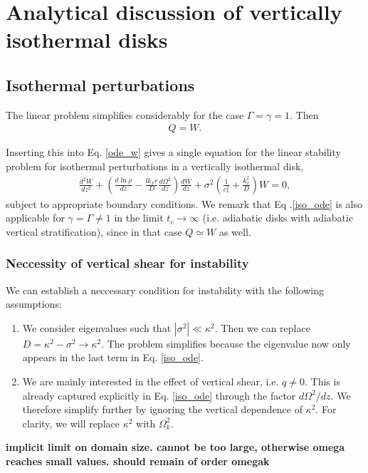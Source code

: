 \section{Analytical discussion of vertically isothermal disks}
\subsection{Isothermal perturbations}
The linear problem simplifies considerably for the case
$\Gamma=\gamma=1$. Then 
\begin{align}
  Q=W. 
\end{align}

Inserting this into Eq. \ref{ode_w} gives a single equation for the linear stability
problem for isothermal perturbations in a vertically isothermal disk, 
\begin{align}\label{iso_ode}
  \frac{d^2W}{dz^2} + \left(\frac{d\ln{\rho}}{dz} - \frac{\ii k_x
      r}{D}\frac{d\Omega^2}{dz}\right) \frac{dW}{dz} +
  \sigma^2\left(\frac{1}{c_s^2} + \frac{k_x^2}{D}\right)W=0, 
\end{align} 
subject to appropriate boundary conditions. We remark that Eq
.\ref{iso_ode} is also applicable for    
$\gamma=\Gamma\neq 1$ in the limit $t_c\to\infty$ (i.e. adiabatic
disks with adiabatic vertical stratification), since in that case  
$Q\simeq W$ as well. 

\subsubsection{Neccessity of vertical shear for instability}\label{integral_relation}
We can establish a neccessary condition for instability with the
following assumptions:

\begin{enumerate}
\item We consider eigenvalues such that
  $|\sigma^2|\ll \kappa^2$. Then we can replace $D=\kappa^2 -\sigma^2\to
  \kappa^2$. The problem simplifies because the eigenvalue now only
  appears in the last term in Eq. \ref{iso_ode}. 
\item We are mainly interested in the effect of vertical shear, i.e. $q\neq
  0$. This is already captured explicitly in Eq. \ref{iso_ode} through
  the factor $d\Omega^2/dz$. We 
  therefore simplify further by ignoring the vertical dependence of
  $\kappa^2$. For clarity, we will replace  $\kappa^2$ with $\Omega_k^2$.  
\end{enumerate}

{\bf implicit limit on domain size. cannot be too large, otherwise omega reaches small values. should remain of order
  omegak}

